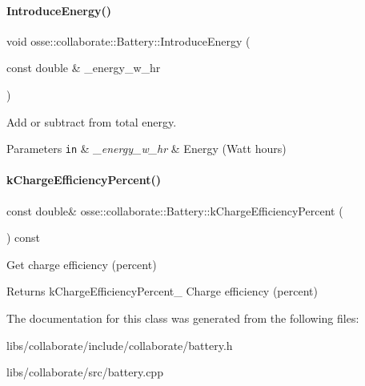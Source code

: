 \paragraph{\texorpdfstring{Introduce\+Energy()}{IntroduceEnergy()}}
{\footnotesize\ttfamily void osse\+::collaborate\+::\+Battery\+::\+Introduce\+Energy (\begin{DoxyParamCaption}\item[{const double \&}]{\+\_\+energy\+\_\+w\+\_\+hr }\end{DoxyParamCaption})}



Add or subtract from total energy. 


\begin{DoxyParams}[1]{Parameters}
\mbox{\tt in}  & {\em \+\_\+energy\+\_\+w\+\_\+hr} & Energy (Watt hours) \\
\hline
\end{DoxyParams}
\mbox{\label{classosse_1_1collaborate_1_1_battery_a98033b5ec818bc5d243b76f87713f8e1}} 
\paragraph{\texorpdfstring{k\+Charge\+Efficiency\+Percent()}{kChargeEfficiencyPercent()}}
{\footnotesize\ttfamily const double\& osse\+::collaborate\+::\+Battery\+::k\+Charge\+Efficiency\+Percent (\begin{DoxyParamCaption}{ }\end{DoxyParamCaption}) const\hspace{0.3cm}{\ttfamily [inline]}}



Get charge efficiency (percent) 

\begin{DoxyReturn}{Returns}
k\+Charge\+Efficiency\+Percent\+\_\+ Charge efficiency (percent) 
\end{DoxyReturn}


The documentation for this class was generated from the following files\+:\begin{DoxyCompactItemize}
\item 
libs/collaborate/include/collaborate/battery.\+h\item 
libs/collaborate/src/battery.\+cpp\end{DoxyCompactItemize}
